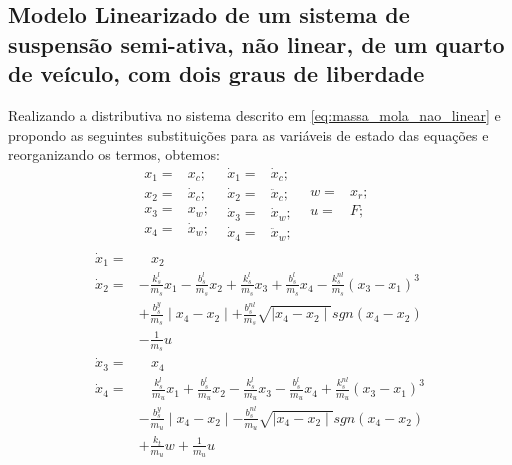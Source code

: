 \subsection{Modelo Linearizado de um sistema de suspensão semi-ativa, não linear, de um quarto de veículo, com dois graus de liberdade }
Realizando a distributiva no sistema descrito em \ref{eq:massa_mola_nao_linear} e propondo as seguintes substituições para as variáveis de estado das equações e reorganizando os termos, obtemos: 
\begin{equation*}
    \begin{split}
        x_{1}=&x_{c};\ \ \\
        x_{2}=&\dot{x}_{c};\ \ \\ 
        x_{3}=&x_{w};\ \ \\               
        x_{4}=&\dot{x}_{w};\ \ \\
    \end{split}
    \begin{split}
        \dot{x}_{1}=&\dot{x}_{c};\ \ \\
        \dot{x}_{2}=&\ddot{x}_{c};\ \ \\
        \dot{x}_{3}=&\dot{x}_{w};\ \ \\        
        \dot{x}_{4}=&\ddot{x}_{w};\ \ \\
    \end{split}
    \begin{split}
        w=&x_{r};\ \ \\
        u=&F;\ \ \\
    \end{split} 
\end{equation*}
\begin{equation} \label{eq:massa_mola_nao_linear_SS}
    \begin{aligned}
        \dot{x}_{1}=&\ \ \ \ x_{2}\\        
        \dot{x}_{2}=&-\frac{k^l_s}{m_s}x_1-\frac{b^l_s}{m_s}x_2+\frac{k^l_s}{m_s}x_3+\frac{b^l_s}{m_s}x_4-\frac{k^{nl}_s}{m_s}(x_3-x_1)^3\\
                    &+\frac{b^y_s}{m_s}\mid x_4-x_2\mid+\frac{b^{nl}_s}{m_s}\sqrt{\mid x_4-x_2\mid}sgn(x_4-x_2)\\
                    &-\frac{1}{m_s}u\\    
        \dot{x}_{3}=&\ \ \ \ x_{4}\\
        \dot{x}_{4}=&\ \ \ \ \frac{k^l_s}{m_u}x_1+\frac{b^l_s}{m_u}x_2-\frac{k^l_s}{m_u}x_3-\frac{b^l_s}{m_u}x_4+\frac{k^{nl}_s}{m_u}(x_3-x_1)^3\\
                    &-\frac{b^y_s}{m_u}\mid x_4-x_2\mid-\frac{b^{nl}_s}{m_u}\sqrt{\mid x_4-x_2\mid}sgn(x_4-x_2)\\
                    &+\frac{k_t}{m_u}w+\frac{1}{m_u}u\\
    \end{aligned}
\end{equation}
    
